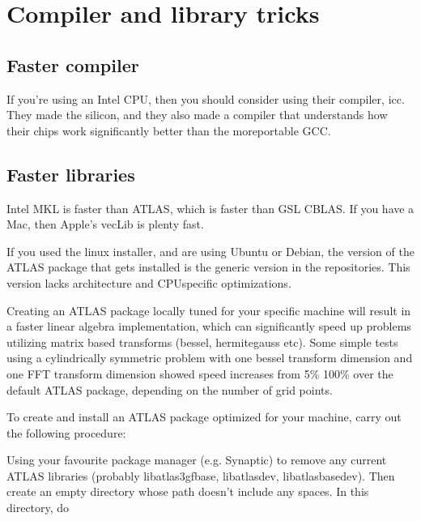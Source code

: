 \documentclass[letterpaper,10pt,english]{sphinxmanual}
\begin{document}
\section{Compiler and library tricks}
\label{\detokenize{optimisation_hints:compiler-and-library-tricks}}

\subsection{Faster compiler}
\label{\detokenize{optimisation_hints:faster-compiler}}
\sphinxAtStartPar
If you’re using an Intel CPU, then you should consider using their compiler, icc. They made the silicon, and they also made a compiler that understands how their chips work significantly better than the more\sphinxhyphen{}portable GCC.


\subsection{Faster libraries}
\label{\detokenize{optimisation_hints:faster-libraries}}
\sphinxAtStartPar
Intel MKL is faster than ATLAS, which is faster than GSL CBLAS. If you have a Mac, then Apple’s vecLib is plenty fast.

\sphinxAtStartPar
{}

\sphinxAtStartPar
If you used the linux installer, and are using Ubuntu or Debian, the version of the ATLAS package that gets installed is the generic version in the repositories. This version lacks architecture and CPU\sphinxhyphen{}specific optimizations.

\sphinxAtStartPar
Creating an ATLAS package locally tuned for your specific machine will result in a faster linear algebra implementation, which can significantly speed up problems utilizing matrix based transforms (bessel, hermite\sphinxhyphen{}gauss etc). Some simple tests using a cylindrically symmetric problem with one bessel transform dimension and one FFT transform dimension showed speed increases from 5\% \sphinxhyphen{} 100\% over the default ATLAS package, depending on the number of grid points.

\sphinxAtStartPar
To create and install an ATLAS package optimized for your machine, carry out the following procedure:

\sphinxAtStartPar
Using your favourite package manager (e.g. Synaptic) to remove any current ATLAS libraries (probably libatlas3gf\sphinxhyphen{}base, libatlas\sphinxhyphen{}dev, libatlas\sphinxhyphen{}base\sphinxhyphen{}dev). Then create an empty directory whose path doesn’t include any spaces. In this directory, do
\end{document}
